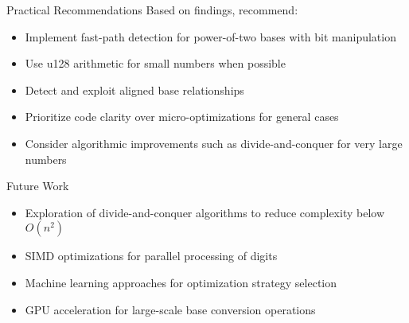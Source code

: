 \documentclass[10pt]{beamer}
\begin{document}
\begin{frame}{Practical Recommendations}
Based on findings, recommend:
\begin{itemize}
\item Implement fast-path detection for power-of-two bases with bit manipulation
\item Use u128 arithmetic for small numbers when possible
\item Detect and exploit aligned base relationships
\item Prioritize code clarity over micro-optimizations for general cases
\item Consider algorithmic improvements such as divide-and-conquer for very large numbers
\end{itemize}
\end{frame}

\begin{frame}{Future Work}
\begin{itemize}
\item Exploration of divide-and-conquer algorithms to reduce complexity below $O(n^2)$ \item SIMD optimizations for parallel processing of digits
\item Machine learning approaches for optimization strategy selection
\item GPU acceleration for large-scale base conversion operations
\end{itemize}
\end{frame}
\end{document}
